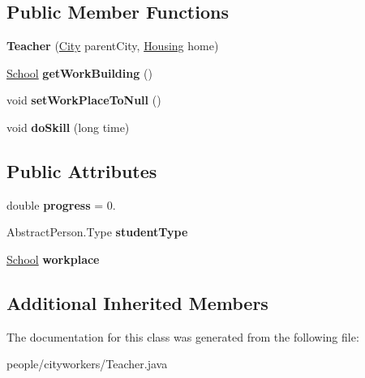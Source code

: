 \subsection*{Public Member Functions}
\begin{DoxyCompactItemize}
\item 
{\bfseries Teacher} (\hyperlink{classcities_1_1_city}{City} parent\+City, \hyperlink{classbuildings_1_1housing_1_1_housing}{Housing} home)\hypertarget{classpeople_1_1cityworkers_1_1_teacher_a14a2a9177e0f73fbb44629eb2fbe93cc}{}\label{classpeople_1_1cityworkers_1_1_teacher_a14a2a9177e0f73fbb44629eb2fbe93cc}

\item 
\hyperlink{classbuildings_1_1workplaces_1_1_school}{School} {\bfseries get\+Work\+Building} ()\hypertarget{classpeople_1_1cityworkers_1_1_teacher_a241f35a2e5f8f2296a49783d6ae1dd55}{}\label{classpeople_1_1cityworkers_1_1_teacher_a241f35a2e5f8f2296a49783d6ae1dd55}

\item 
void {\bfseries set\+Work\+Place\+To\+Null} ()\hypertarget{classpeople_1_1cityworkers_1_1_teacher_a59205708d2bff1da60a050b4a549c0c7}{}\label{classpeople_1_1cityworkers_1_1_teacher_a59205708d2bff1da60a050b4a549c0c7}

\item 
void {\bfseries do\+Skill} (long time)\hypertarget{classpeople_1_1cityworkers_1_1_teacher_ab89c80a09eac89688d4999f7dab618fc}{}\label{classpeople_1_1cityworkers_1_1_teacher_ab89c80a09eac89688d4999f7dab618fc}

\end{DoxyCompactItemize}
\subsection*{Public Attributes}
\begin{DoxyCompactItemize}
\item 
double {\bfseries progress} = 0.\hypertarget{classpeople_1_1cityworkers_1_1_teacher_a0865171501f204b074b433a857182517}{}\label{classpeople_1_1cityworkers_1_1_teacher_a0865171501f204b074b433a857182517}

\item 
Abstract\+Person.\+Type {\bfseries student\+Type}\hypertarget{classpeople_1_1cityworkers_1_1_teacher_a4101354499ecd1c8cb94c753bb86d077}{}\label{classpeople_1_1cityworkers_1_1_teacher_a4101354499ecd1c8cb94c753bb86d077}

\item 
\hyperlink{classbuildings_1_1workplaces_1_1_school}{School} {\bfseries workplace}\hypertarget{classpeople_1_1cityworkers_1_1_teacher_a698b020a8f2ca4c1181bf7912572dbb4}{}\label{classpeople_1_1cityworkers_1_1_teacher_a698b020a8f2ca4c1181bf7912572dbb4}

\end{DoxyCompactItemize}
\subsection*{Additional Inherited Members}


The documentation for this class was generated from the following file\+:\begin{DoxyCompactItemize}
\item 
people/cityworkers/Teacher.\+java\end{DoxyCompactItemize}
